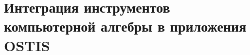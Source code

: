 \section{Интеграция инструментов компьютерной алгебры в приложения OSTIS}
{\label{sec_integration_algebra}} 
